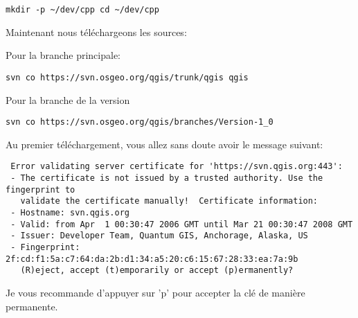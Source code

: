 \begin{verbatim}
mkdir -p ~/dev/cpp cd ~/dev/cpp 
\end{verbatim}

Maintenant nous t\'el\'echargeons les sources:

Pour la branche principale:

\begin{verbatim}
svn co https://svn.osgeo.org/qgis/trunk/qgis qgis 
\end{verbatim}

Pour la branche de la version 

\begin{verbatim}
svn co https://svn.osgeo.org/qgis/branches/Version-1_0
\end{verbatim}

Au premier t\'el\'echargement, vous allez sans doute avoir le message suivant:

\begin{verbatim}
 Error validating server certificate for 'https://svn.qgis.org:443':
 - The certificate is not issued by a trusted authority. Use the fingerprint to
   validate the certificate manually!  Certificate information:
 - Hostname: svn.qgis.org
 - Valid: from Apr  1 00:30:47 2006 GMT until Mar 21 00:30:47 2008 GMT
 - Issuer: Developer Team, Quantum GIS, Anchorage, Alaska, US
 - Fingerprint: 2f:cd:f1:5a:c7:64:da:2b:d1:34:a5:20:c6:15:67:28:33:ea:7a:9b
   (R)eject, accept (t)emporarily or accept (p)ermanently?  
\end{verbatim}

Je vous recommande d'appuyer sur 'p' pour accepter la cl\'e de mani\`ere permanente.


